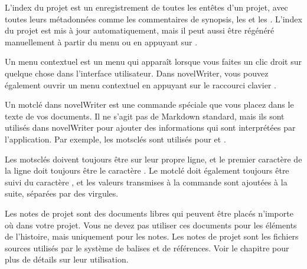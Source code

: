 \documentclass[a4paper,11pt,french]{sphinxmanual}
\begin{document}
\begin{description}
\sphinxAtStartPar
L’index du projet est un enregistrement de toutes les en\sphinxhyphen{}têtes d’un projet, avec toutes leurs métadonnées comme les commentaires de synopsis, les {\hyperref[\detokenize{int_glossary:term-Tag}]{}} et les {\hyperref[\detokenize{int_glossary:term-Reference}]{}}. L’index du projet est mis à jour automatiquement, mais il peut aussi être régénéré manuellement à partir du menu  ou en appuyant sur .

\sphinxAtStartPar
Un menu contextuel est un menu qui apparaît lorsque vous faites un clic droit sur quelque chose dans l’interface utilisateur. Dans novelWriter, vous pouvez également ouvrir un menu contextuel en appuyant sur le raccourci clavier .

\sphinxAtStartPar
Un mot\sphinxhyphen{}clé dans novelWriter est une commande spéciale que vous placez dans le texte de vos documents. Il ne s’agit pas de Markdown standard, mais ils sont utilisés dans novelWriter pour ajouter des informations qui sont interprétées par l’application. Par exemple, les mots\sphinxhyphen{}clés sont utilisés pour {\hyperref[\detokenize{int_glossary:term-Tag}]{}} et {\hyperref[\detokenize{int_glossary:term-Reference}]{}}.

\sphinxAtStartPar
Les mots\sphinxhyphen{}clés doivent toujours être sur leur propre ligne, et le premier caractère de la ligne doit toujours être le caractère . Le mot\sphinxhyphen{}clé doit également toujours être suivi du caractère \sphinxcode{\sphinxupquote{:}}, et les valeurs transmises à la commande sont ajoutées à la suite, séparées par des virgules.

\sphinxAtStartPar
Les notes de projet sont des documents libres qui peuvent être placés n’importe où dans votre projet. Vous ne devez pas utiliser ces documents pour les éléments de l’histoire, mais uniquement pour les notes. Les notes de projet sont les fichiers sources utilisés par le système de balises et de références. Voir le chapitre {\hyperref[\detokenize{project_references:a-references}]{}} pour plus de détails sur leur utilisation.


\end{description}
\end{document}
